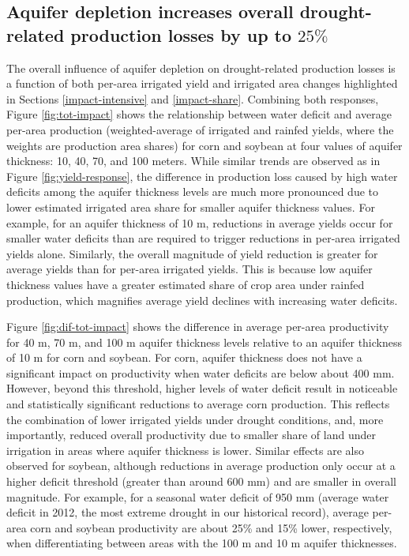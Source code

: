 \documentclass[
]{article}
\begin{document}
\hypertarget{aquifer-depletion-increases-overall-drought-related-production-losses-by-up-to-25}{%
\subsection{\texorpdfstring{Aquifer depletion increases overall drought-related production losses by up to \(25\%\)}{Aquifer depletion increases overall drought-related production losses by up to 25\textbackslash\%}}\label{aquifer-depletion-increases-overall-drought-related-production-losses-by-up-to-25}}

The overall influence of aquifer depletion on drought-related production losses is a function of both per-area irrigated yield and irrigated area changes highlighted in Sections \ref{impact-intensive} and \ref{impact-share}. Combining both responses, Figure \ref{fig:tot-impact} shows the relationship between water deficit and average per-area production (weighted-average of irrigated and rainfed yields, where the weights are production area shares) for corn and soybean at four values of aquifer thickness: 10, 40, 70, and 100 meters. While similar trends are observed as in Figure \ref{fig:yield-response}, the difference in production loss caused by high water deficits among the aquifer thickness levels are much more pronounced due to lower estimated irrigated area share for smaller aquifer thickness values. For example, for an aquifer thickness of 10 m, reductions in average yields occur for smaller water deficits than are required to trigger reductions in per-area irrigated yields alone. Similarly, the overall magnitude of yield reduction is greater for average yields than for per-area irrigated yields. This is because low aquifer thickness values have a greater estimated share of crop area under rainfed production, which magnifies average yield declines with increasing water deficits. 

Figure \ref{fig:dif-tot-impact} shows the difference in average per-area productivity for 40 m, 70 m, and 100 m aquifer thickness levels relative to an aquifer thickness of 10 m for corn and soybean. For corn, aquifer thickness does not have a significant impact on productivity when water deficits are below about 400 mm. However, beyond this threshold, higher levels of water deficit result in noticeable and statistically significant reductions to average corn production. This reflects the combination of lower irrigated yields under drought conditions, and, more importantly, reduced overall productivity due to smaller share of land under irrigation in areas where aquifer thickness is lower. Similar effects are also observed for soybean, although reductions in average production only occur at a higher deficit threshold (greater than around 600 mm) and are smaller in overall magnitude. For example, for a seasonal water deficit of 950 mm (average water deficit in 2012, the most extreme drought in our historical record), average per-area corn and soybean productivity are about 25\% and 15\% lower, respectively, when differentiating between areas with the 100 m and 10 m aquifer thicknesses.
\end{document}
